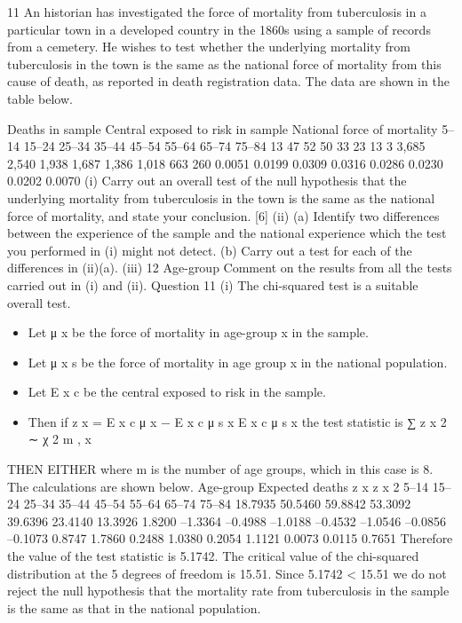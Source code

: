 \documentclass[a4paper,12pt]{article}
\begin{document}
\begin{enumerate}
11
An historian has investigated the force of mortality from tuberculosis in a particular town in a developed country in the 1860s using a sample of records from a cemetery. He wishes to test whether the underlying mortality from tuberculosis in the town is
the same as the national force of mortality from this cause of death, as reported in death registration data. The data are shown in the table below.

Deaths in
sample Central exposed to
risk in sample National force
of mortality
5–14
15–24
25–34
35–44
45–54
55–64
65–74
75–84 13
47
52
50
33
23
13
3 3,685
2,540
1,938
1,687
1,386
1,018
663
260 0.0051
0.0199
0.0309
0.0316
0.0286
0.0230
0.0202
0.0070
(i) Carry out an overall test of the null hypothesis that the underlying mortality
from tuberculosis in the town is the same as the national force of mortality,
and state your conclusion.
[6]
(ii) (a)
Identify two differences between the experience of the sample
and the national experience which the test you performed in (i)
might not detect.
(b)
Carry out a test for each of the differences in (ii)(a).
(iii)
12
Age-group
Comment on the results from all the tests carried out in (i) and (ii).
\newpage
Question 11
(i)
The chi-squared test is a suitable overall test.
\begin{itemize}
\item Let μ x be the force of mortality in age-group x in the sample.
\item Let μ x s be the force of mortality in age group x in the national population.
\item Let E x c be the central exposed to risk in the sample.
\item Then if z x =
E x c μ x − E x c μ s x
E x c μ s x
the test statistic is
∑ z x 2 ∼ χ 2 m ,
x
\end{itemize}
THEN EITHER
where m is the number of age groups, which in this case is 8.
The calculations are shown below.
Age-group Expected deaths z x z x 2
5–14
15–24
25–34
35–44
45–54
55–64
65–74
75–84 18.7935
50.5460
59.8842
53.3092
39.6396
23.4140
13.3926
1.8200 –1.3364
–0.4988
–1.0188
–0.4532
–1.0546
–0.0856
–0.1073
0.8747 1.7860
0.2488
1.0380
0.2054
1.1121
0.0073
0.0115
0.7651
Therefore the value of the test statistic is 5.1742.
The critical value of the chi-squared distribution at the 5%
degrees of freedom is 15.51.
Since 5.1742 < 15.51 we do not reject the null hypothesis that the mortality rate from tuberculosis in the sample is the same as that in the national population.

\end{enumerate}
\end{document}
